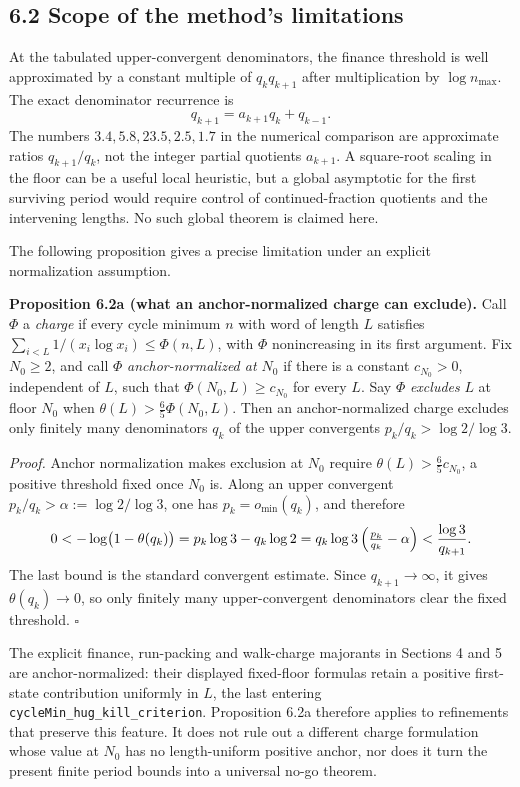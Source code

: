 \documentclass[12pt]{article}
\begin{document}
\subsection{6.2 Scope of the method's
limitations}\label{scope-of-the-methods-limitations}

At the tabulated upper-convergent denominators, the finance threshold is
well approximated by a constant multiple of \(q_kq_{k+1}\) after
multiplication by \(\log n_{\max}\). The exact denominator recurrence is
\[
q_{k+1}=a_{k+1}q_k+q_{k-1}.
\] The numbers \(3.4,5.8,23.5,2.5,1.7\) in the numerical comparison are
approximate ratios \(q_{k+1}/q_k\), not the integer partial quotients
\(a_{k+1}\). A square-root scaling in the floor can be a useful local
heuristic, but a global asymptotic for the first surviving period would
require control of continued-fraction quotients and the intervening
lengths. No such global theorem is claimed here.

The following proposition gives a precise limitation under an explicit
normalization assumption.

\textbf{Proposition 6.2a (what an anchor-normalized charge can
exclude).} Call \(\Phi\) a \emph{charge} if every cycle minimum \(n\)
with word of length \(L\) satisfies
\(\sum_{i<L}1/(x_i\log x_i)\le\Phi(n,L)\), with \(\Phi\) nonincreasing
in its first argument. Fix \(N_0\ge2\), and call \(\Phi\)
\emph{anchor-normalized at \(N_0\)} if there is a constant
\(c_{N_0}>0\), independent of \(L\), such that
\(\Phi(N_0,L)\ge c_{N_0}\) for every \(L\). Say \(\Phi\) \emph{excludes}
\(L\) at floor \(N_0\) when \(\theta(L)>\tfrac65\Phi(N_0,L)\). Then an
anchor-normalized charge excludes only finitely many denominators
\(q_k\) of the upper convergents \(p_k/q_k>\log2/\log3\).

\emph{Proof.} Anchor normalization makes exclusion at \(N_0\) require
\(\theta(L)>\tfrac65c_{N_0}\), a positive threshold fixed once \(N_0\)
is. Along an upper convergent \(p_k/q_k>\alpha:=\log2/\log3\), one has
\(p_k=o_{\min}(q_k)\), and therefore \[
0<-\log\bigl(1-\theta(q_k)\bigr)=p_k\log3-q_k\log2
=q_k\log 3\,\Bigl(\tfrac{p_k}{q_k}-\alpha\Bigr)
<\frac{\log 3}{q_{k+1}}.
\] The last bound is the standard convergent estimate. Since
\(q_{k+1}\to\infty\), it gives \(\theta(q_k)\to0\), so only finitely
many upper-convergent denominators clear the fixed threshold.
\(\square\)

The explicit finance, run-packing and walk-charge majorants in Sections
4 and 5 are anchor-normalized: their displayed fixed-floor formulas
retain a positive first-state contribution uniformly in \(L\), the last
entering \texttt{\nolinkurl{cycleMin_hug_kill_criterion}}. Proposition
6.2a therefore applies to refinements that preserve this feature. It
does not rule out a different charge formulation whose value at \(N_0\)
has no length-uniform positive anchor, nor does it turn the present
finite period bounds into a universal no-go theorem.
\end{document}
